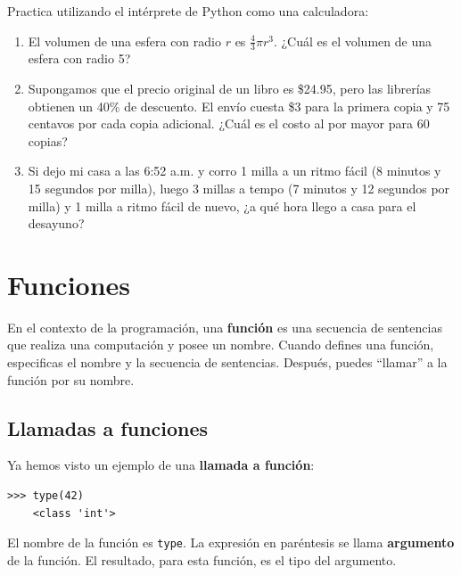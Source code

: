 \documentclass[10pt]{book}
\begin{document}
\begin{exercise}

Practica utilizando el intérprete de Python como una calculadora:

\begin{enumerate}

\item El volumen de una esfera con radio $r$ es $\frac{4}{3} \pi r^3$.
  ¿Cuál es el volumen de una esfera con radio 5?

\item Supongamos que el precio original de un libro es \$24.95, pero las librerías obtienen
  un 40\% de descuento.  El envío cuesta \$3 para la primera copia y 75 centavos
  por cada copia adicional.  ¿Cuál es el costo al por mayor para
  60 copias?

\item Si dejo mi casa a las 6:52 a.m. y corro 1 milla a un ritmo fácil
  (8 minutos y 15 segundos por milla), luego 3 millas a tempo (7 minutos y 12 segundos por milla) y 1 milla
  a ritmo fácil de nuevo, ¿a qué hora llego a casa para el desayuno?

\end{enumerate}
\end{exercise}


\chapter{Funciones}
\label{funcchap}

En el contexto de la programación, una {\bf función} es una secuencia de sentencias
que realiza una computación y posee un nombre.  Cuando defines una función,
especificas el nombre y la secuencia de sentencias.  Después, puedes
``llamar'' a la función por su nombre.

\section{Llamadas a funciones}
\label{functionchap}

Ya hemos visto un ejemplo de una {\bf llamada a función}:

\begin{verbatim}
>>> type(42)
    <class 'int'>
\end{verbatim}
%
El nombre de la función es {\tt type}.  La expresión en paréntesis
se llama {\bf argumento} de la función.  El resultado, para esta
función, es el tipo del argumento.
\end{document}
